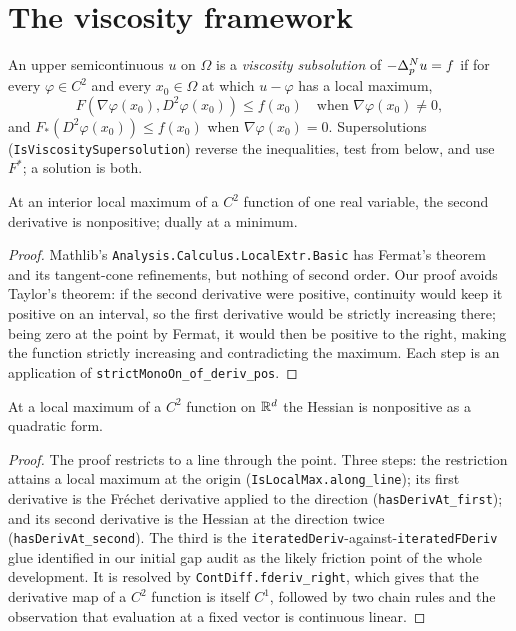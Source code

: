 \chapter{The viscosity framework}

\begin{definition}\label{def:sub}
\leanok
An upper semicontinuous $u$ on $\Omega$ is a \emph{viscosity subsolution} of
$-\Delta_p^{N} u = f$ if for every $\varphi \in C^2$ and every $x_0 \in \Omega$ at
which $u - \varphi$ has a local maximum,
\[
  F(\nabla\varphi(x_0), D^2\varphi(x_0)) \le f(x_0)
  \quad\text{when } \nabla\varphi(x_0) \ne 0,
\]
and $F_*(D^2\varphi(x_0)) \le f(x_0)$ when $\nabla\varphi(x_0) = 0$.
Supersolutions (\texttt{IsViscositySupersolution}) reverse the inequalities,
test from below, and use $F^*$; a solution is both.
\end{definition}


\begin{theorem}\label{thm:so1}
\leanok
At an interior local maximum of a $C^2$ function of one real variable, the
second derivative is nonpositive; dually at a minimum.
\end{theorem}

\begin{proof}
\leanok
Mathlib's \texttt{Analysis.Calculus.LocalExtr.Basic} has Fermat's theorem and
its tangent-cone refinements, but nothing of second order. Our proof avoids Taylor's theorem: if the second
derivative were positive, continuity would keep it positive on an interval, so
the first derivative would be strictly increasing there; being zero at the
point by Fermat, it would then be positive to the right, making the function
strictly increasing and contradicting the maximum. Each step is an application
of \texttt{strictMonoOn\_of\_deriv\_pos}.
\end{proof}


\begin{theorem}\label{thm:somulti}
\leanok
At a local maximum of a $C^2$ function on $\mathbb{R}^d$ the Hessian is nonpositive as
a quadratic form.
\end{theorem}

\begin{proof}
\leanok
{}
The proof restricts to a line through the point. Three steps: the restriction
attains a local maximum at the origin
(\texttt{IsLocalMax.along\_line}); its first derivative is the Fréchet
derivative applied to the direction (\texttt{hasDerivAt\_first}); and its
second derivative is the Hessian at the direction twice
(\texttt{hasDerivAt\_second}). The third is the
\texttt{iteratedDeriv}-against-\texttt{iteratedFDeriv} glue identified in our
initial gap audit as the likely friction point of the whole development. It is
resolved by \texttt{ContDiff.fderiv\_right}, which gives that the derivative
map of a $C^2$ function is itself $C^1$, followed by two chain rules and the
observation that evaluation at a fixed vector is continuous linear.
\end{proof}


